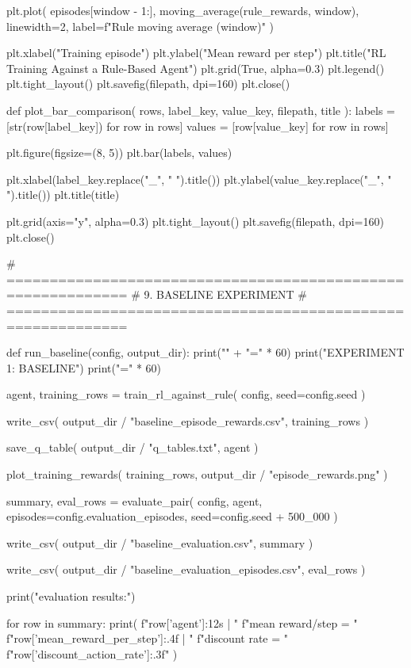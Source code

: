         plt.plot(
            episodes[window - 1:],
            moving_average(rule_rewards, window),
            linewidth=2,
            label=f"Rule moving average ({window})"
        )

    plt.xlabel("Training episode")
    plt.ylabel("Mean reward per step")
    plt.title("RL Training Against a Rule-Based Agent")
    plt.grid(True, alpha=0.3)
    plt.legend()
    plt.tight_layout()
    plt.savefig(filepath, dpi=160)
    plt.close()


def plot_bar_comparison(
    rows, label_key, value_key, filepath, title
):
    labels = [str(row[label_key]) for row in rows]
    values = [row[value_key] for row in rows]

    plt.figure(figsize=(8, 5))
    plt.bar(labels, values)

    plt.xlabel(label_key.replace("_", " ").title())
    plt.ylabel(value_key.replace("_", " ").title())
    plt.title(title)

    plt.grid(axis="y", alpha=0.3)
    plt.tight_layout()
    plt.savefig(filepath, dpi=160)
    plt.close()


# ============================================================
# 9. BASELINE EXPERIMENT
# ============================================================

def run_baseline(config, output_dir):
    print("\n" + "=" * 60)
    print("EXPERIMENT 1: BASELINE")
    print("=" * 60)

    agent, training_rows = train_rl_against_rule(
        config, seed=config.seed
    )

    write_csv(
        output_dir / "baseline_episode_rewards.csv",
        training_rows
    )

    save_q_table(
        output_dir / "q_tables.txt", agent
    )

    plot_training_rewards(
        training_rows,
        output_dir / "episode_rewards.png"
    )

    summary, eval_rows = evaluate_pair(
        config,
        agent,
        episodes=config.evaluation_episodes,
        seed=config.seed + 500_000
    )

    write_csv(
        output_dir / "baseline_evaluation.csv",
        summary
    )

    write_csv(
        output_dir / "baseline_evaluation_episodes.csv",
        eval_rows
    )

    print("\nSeparate evaluation results:")

    for row in summary:
        print(
            f"{row['agent']:12s} | "
            f"mean reward/step = "
            f"{row['mean_reward_per_step']:.4f} | "
            f"discount rate = "
            f"{row['discount_action_rate']:.3f}"
        )

